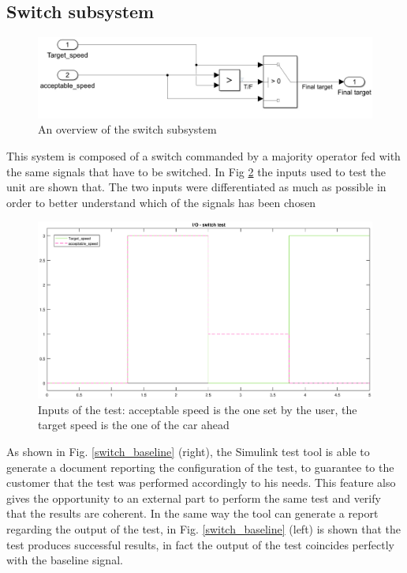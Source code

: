 \documentclass[12pt,a4paper]{report}
\begin{document}
\subsection{Switch subsystem}
\begin{figure}[!h]
	\centering
	\includegraphics[scale=0.34]{switch_subs.jpg}
	\caption{An overview of the switch subsystem}
	\label{switch_subs}
\end{figure}
\FloatBarrier
This system is composed of a switch commanded by a majority operator fed with the same signals that have to be switched. 
In Fig \ref{IO_baseline_switch_detach} the inputs used to test the unit are shown that. The two inputs were differentiated as much as possible in order to better understand which of the signals has been chosen
\begin{figure}[!h]
	\centering
	\includegraphics[scale=0.4]{IO_baseline_switch_detach.eps}
	\caption{Inputs of the test: acceptable speed is the one set by the user, the target speed is the one of the car ahead}
	\label{IO_baseline_switch_detach}
\end{figure}
As shown in Fig. \ref{switch_baseline} (right), the Simulink test tool is able to generate a document reporting the configuration of the test, to guarantee to the customer that the test was performed accordingly to his needs. This feature also gives the opportunity to an external part to perform the same test and verify that the results are coherent.
In the same way the tool can generate a report regarding the output of the test, in Fig. \ref{switch_baseline} (left) is shown that the test produces successful results, in fact the output of the test coincides perfectly with the baseline signal. 
\end{document}
